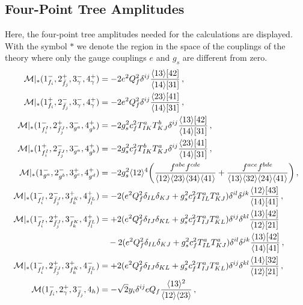 \begin{subappendices}
\subsection{Four-Point Tree Amplitudes}

Here, the four-point tree amplitudes needed for the calculations are displayed.
With the symbol $*$ we denote the region in the space of the couplings of the theory where only
the gauge couplings $e$ and $g_s$ are different from zero.
\begin{align}
     \mathcal M|_*(1^-_{f_i},2^+_{\bar f_j},3^-_\gamma,4^+_\gamma) &= -2e^2Q_f^2\delta^{ij}\frac{\agl{1}{3}\sqr{4}{2}}{\agl{1}{4}\sqr{3}{1}}\,, \\
    \mathcal M|_*(1^+_{f_i},2^-_{\bar f_j},3^-_\gamma,4^+_\gamma) &= -2e^2Q_f^2\delta^{ij}\frac{\agl{2}{3}\sqr{4}{1}}{\agl{1}{4}\sqr{3}{1}}\,, \\
    \mathcal M|_*(1^-_{f_i^I},2^+_{\bar f_j^J},3^-_{g^a},4^+_{g^b}) &= -2g_s^2c_f^2T^a_{IK}T^b_{KJ}\delta^{ij}\frac{\agl{1}{3}\sqr{4}{2}}{\agl{1}{4}\sqr{3}{1}}\,, \\
    \mathcal M|_*(1^+_{f_i^I},2^-_{\bar f_j^J},3^-_{g^a},4^+_{g^b}) &= -2g_s^2c_f^2T^b_{IK}T^a_{KJ}\delta^{ij}\frac{\agl{2}{3}\sqr{4}{1}}{\agl{1}{4}\sqr{3}{1}}\,, \\
    \mathcal M|_*(1^-_{g^a},2^-_{g^b},3^+_{g^c},4^+_{g^d}) &= -2g_s^2\agl{1}{2}^4\bigg(\frac{f^{abe}f^{cde}}{\agl{1}{2}\agl{2}{3}\agl{3}{4}\agl{4}{1}}+\frac{f^{ace}f^{bde}}{\agl{1}{3}\agl{3}{2}\agl{2}{4}\agl{4}{1}}\bigg)\,,\\
    \mathcal M|_*(1^-_{f_i^I},2^-_{\bar f_j^J},3^+_{f_k^K},4^+_{\bar f_l^L}) &= -2 (e^2 Q_f^2 \delta_{IL}\delta_{KJ}+g_s^2c_f^2T^a_{IL}T^a_{KJ}) \delta^{il}\delta^{jk} \frac{\agl{1}{2}\sqr{4}{3}}{\agl{1}{4}\sqr{4}{1}}\,, \\
    \mathcal M|_*(1^-_{f_i^I},2^+_{\bar f_j^J},3^-_{f_k^K},4^+_{\bar f_l^L}) &= +2(e^2Q_f^2\delta_{IJ}\delta_{KL}+g_s^2c_f^2T^a_{IJ}T^a_{KL})\delta^{ij}\delta^{kl} \frac{\agl{1}{3}\sqr{4}{2}}{\agl{1}{2}\sqr{2}{1}}\nonumber \\
    &\quad - 2(e^2Q_f^2\delta_{IL}\delta_{KJ}+g_s^2c_f^2T^a_{IL}T^a_{KJ}) \delta^{il}\delta^{jk} \frac{\agl{1}{3}\sqr{4}{2}}{\agl{1}{4}\sqr{4}{1}}\,, \\
    \mathcal M|_*(1^-_{f_i^I},2^+_{\bar f_j^J},3^+_{f_k^K},4^-_{\bar f_l^L}) &= +2(e^2Q_f^2\delta_{IJ}\delta_{KL}+g_s^2c_f^2T^a_{IJ}T^a_{KL})\delta^{ij}\delta^{kl} \frac{\agl{1}{4}\sqr{3}{2}}{\agl{1}{2}\sqr{2}{1}}\,,\\
    \mathcal M(1^-_{f_i},2^+_\gamma,3^-_{\bar f_j},4_h) &= -\sqrt{2} y_i \delta^{ij} e Q_f \frac{\agl{1}{3}^2}{\agl{1}{2}\agl{2}{3}}\,, \\

\end{align}
\end{subappendices}
